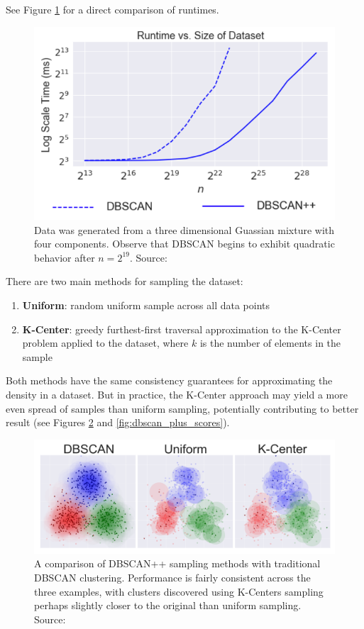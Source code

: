 See Figure \ref{fig:runtime} for a direct comparison of runtimes.

\begin{figure}[h]
\centering
\includegraphics[scale=0.48]{chapter_2/files/dbscan_plus_runtimes.png}
\caption{Data was generated from a three dimensional Guassian mixture with four components. Observe that DBSCAN begins to exhibit quadratic behavior after $n=2^19$. Source: \cite{dbscanpp}}
\label{fig:runtime}
\end{figure}

There are two main methods for sampling the dataset:
\begin{enumerate}
    \item \textbf{Uniform}: random uniform sample across all data points
    \item \textbf{K-Center}: greedy furthest-first traversal approximation to the K-Center problem applied to the dataset, where $k$ is the number of elements in the sample
\end{enumerate}

Both methods have the same consistency guarantees for approximating the density in a dataset. But in practice, the K-Center approach may yield a more even spread of samples than uniform sampling, potentially contributing to better result (see Figures \ref{fig:dbscan_plus} and \ref{fig:dbscan_plus_scores}).

\begin{figure}[h]
\centering
\includegraphics[scale=0.27]{chapter_2/files/dbscan_plus_comparison.png}
\caption{A comparison of DBSCAN++ sampling methods with traditional DBSCAN clustering. Performance is fairly consistent across the three examples, with clusters discovered using K-Centers sampling perhaps slightly closer to the original than uniform sampling. Source: \cite{dbscanpp}}
\label{fig:dbscan_plus}
\end{figure}

